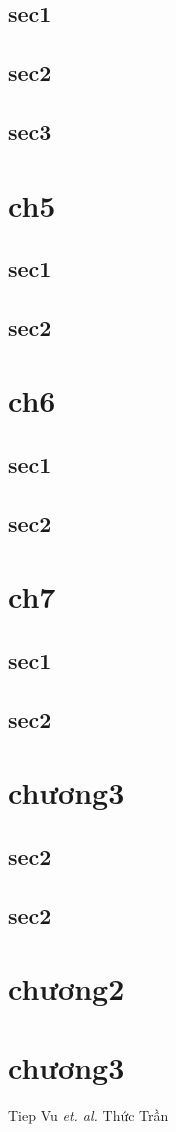 \documentclass[12pt,twoside]{report}
\begin{document}
\section{sec1}
\lipsum
\section{sec2}
\lipsum
\section{sec3}
\lipsum
\chapter{ch5}
\section{sec1}
\lipsum
\section{sec2}
\lipsum
\chapter{ch6}
\section{sec1}
\lipsum
\section{sec2}
\lipsum
\chapter{ch7}
\section{sec1}
\lipsum
\section{sec2}
\lipsum
\chapter{chương3}
\section{sec2}
\lipsum
\section{sec2}
\lipsum
\chapter{chương2}
\lipsum
\chapter*{chương3}
\lipsum

Tiep Vu \textit{et. al.}\cite{knuthwebsite,vu2016histopathological}
Thức Trần \cite{einstein,vu2015dfdl}


\end{document}
